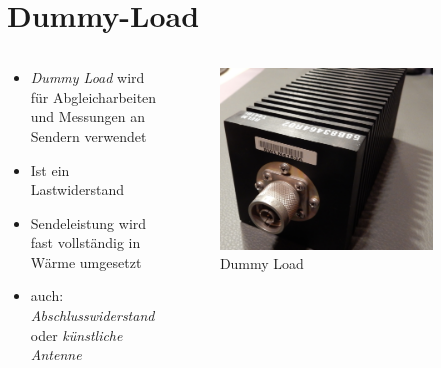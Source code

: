 
\section{Dummy-Load}
\label{section:dummy_load_1}
\begin{frame}%

\begin{columns}
    \begin{column}{0.48\textwidth}
    \begin{itemize}
  \item \emph{Dummy Load} wird für Abgleicharbeiten und Messungen an Sendern verwendet
  \item Ist ein Lastwiderstand
  \item Sendeleistung wird fast vollständig in Wärme umgesetzt
  \item auch: \emph{Abschlusswiderstand} oder \emph{künstliche Antenne}
  \end{itemize}

    \end{column}
   \begin{column}{0.48\textwidth}
       
\begin{figure}
    \includegraphics[width=0.85\textwidth]{foto/68}
    \caption{\scriptsize Dummy Load}
    \label{n_antennenanpassung_dummy_load}
\end{figure}

   \end{column}
\end{columns}

\end{frame}


